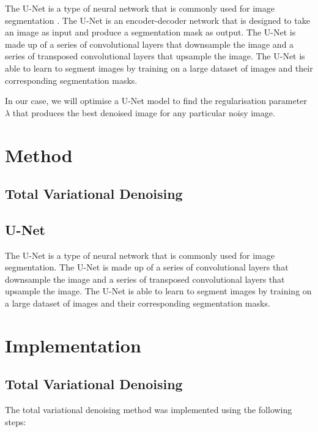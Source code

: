 \documentclass[12pt]{article}
\begin{document}
The U-Net is a type of neural network that is commonly used for image segmentation \cite{ronneberger2015unet}.
The U-Net is an encoder-decoder network that is designed to take an image as input and produce a segmentation mask as output.
The U-Net is made up of a series of convolutional layers that downsample the image and a series of transposed convolutional layers that upsample the image.
The U-Net is able to learn to segment images by training on a large dataset of images and their corresponding segmentation masks.

In our case, we will optimise a U-Net model to find the regularisation parameter $\lambda$ that produces the best denoised image for any particular noisy image.

\section{Method}

\subsection{Total Variational Denoising}



\subsection{U-Net}

The U-Net is a type of neural network that is commonly used for image segmentation.
The U-Net is made up of a series of convolutional layers that downsample the image and a series of transposed convolutional layers that upsample the image.
The U-Net is able to learn to segment images by training on a large dataset of images and their corresponding segmentation masks.

\section{Implementation}

\subsection{Total Variational Denoising}

The total variational denoising method was implemented using the following steps:
\end{document}
